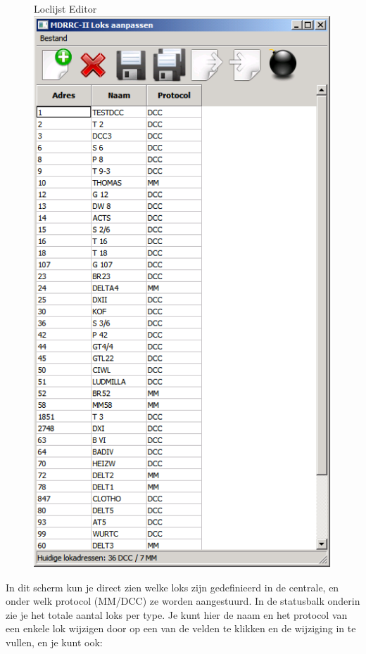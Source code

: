 \documentclass[12pt,a4paper]{report}
\begin{document}
\begin{figure}[!ht]
  \captionbox
  {Loclijst Editor\label{scs:loclisteditor}}
  {\includegraphics[scale=1.0]{images/rcu_screenshot4}}\\
\end{figure}

In dit scherm kun je direct zien welke loks zijn gedefinieerd in de centrale, en onder welk protocol (MM/DCC) ze worden aangestuurd. In de statusbalk onderin zie je het totale aantal loks per type.
Je kunt hier de naam en het protocol van een enkele lok wijzigen door op een van de velden te klikken en de wijziging in te vullen, en je kunt ook:
\end{document}
